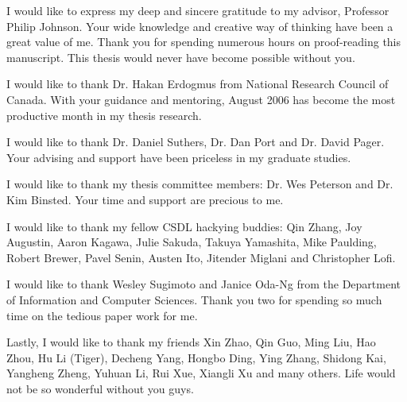 \begin{acknowledgments}

I would like to express my deep and sincere gratitude to my advisor, Professor Philip Johnson. Your wide knowledge and creative way of thinking have been a great value of me. Thank you for spending numerous hours on proof-reading this manuscript. This thesis would never have become possible without you.

I would like to thank Dr. Hakan Erdogmus from National Research Council of Canada. With your guidance and mentoring, August 2006 has become the most productive month in my thesis research.

I would like to thank Dr. Daniel Suthers, Dr. Dan Port and Dr. David Pager. Your advising and support have been priceless in my graduate studies. 

I would like to thank my thesis committee members: Dr. Wes Peterson and Dr. Kim Binsted. Your time and support are precious to me.

I would like to thank my fellow CSDL hackying buddies: Qin Zhang, Joy Augustin, Aaron Kagawa, Julie Sakuda, Takuya Yamashita, Mike Paulding, Robert Brewer, Pavel Senin, Austen Ito, Jitender Miglani and Christopher Lofi. 

I would like to thank Wesley Sugimoto and Janice Oda-Ng from the Department of Information and Computer Sciences. Thank you two for spending so much time on the tedious paper work for me.

Lastly, I would like to thank my friends Xin Zhao, Qin Guo, Ming Liu, Hao Zhou, Hu Li (Tiger), Decheng Yang, Hongbo Ding, Ying Zhang, Shidong Kai, Yangheng Zheng, Yuhuan Li, Rui Xue, Xiangli Xu and many others. Life would not be so wonderful without you guys.
\end{acknowledgments}








